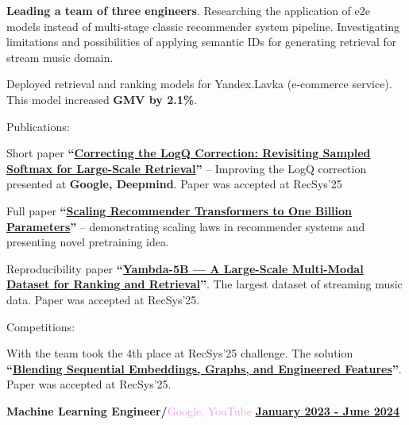 \documentclass[10pt,a4paper]{report}
\begin{document}
{\leftskip=3mm
    \vspace{2mm}

    \textbf{Leading a team of three engineers}. Researching the application of e2e models instead of multi-stage classic recommender system pipeline. Investigating limitations and possibilities of applying semantic IDs for generating retrieval for stream music domain.

    \vspace{2mm}
    
    Deployed retrieval and ranking models for Yandex.Lavka (e-commerce service). This model increased \textbf{GMV by 2.1\%}. 
    
    \vspace{2mm}
    
    Publications: 
    
    \hspace{3mm} Short paper \textbf{\enquote{\href{https://dl.acm.org/doi/abs/10.1145/3705328.3748033}{Correcting the LogQ Correction: Revisiting Sampled Softmax for Large-Scale Retrieval}}} -- Improving the LogQ correction presented at \textbf{Google, Deepmind}. Paper was accepted at RecSys'25
    
    \hspace{3mm} Full paper \textbf{\enquote{\href{https://arxiv.org/abs/2507.15994}{Scaling Recommender Transformers to One Billion Parameters}}} -- demonstrating scaling laws in recommender systems and presenting novel pretraining idea. 
    
    \hspace{3mm} Reproducibility paper \textbf{\enquote{\href{https://dl.acm.org/doi/abs/10.1145/3705328.3748163}{Yambda-5B — A Large-Scale Multi-Modal Dataset for Ranking and Retrieval}}}. The largest dataset of streaming music data. Paper was accepted at RecSys'25.
    
    \vspace{2mm}
    
    Competitions: 
    
    \hspace{3mm} With the team took the 4th place at RecSys'25 challenge. The solution \textbf{\enquote{\href{https://dl.acm.org/doi/full/10.1145/3758126.3758131}{Blending Sequential Embeddings, Graphs, and Engineered Features}}}. Paper was accepted at RecSys'25.
    
    \vspace{2mm}
}

\textbf{\large{Machine Learning Engineer/}}\textcolor{Plum}{Google, YouTube}
\hfill
\textbf {\underline{January 2023 - June 2024}}
\end{document}
